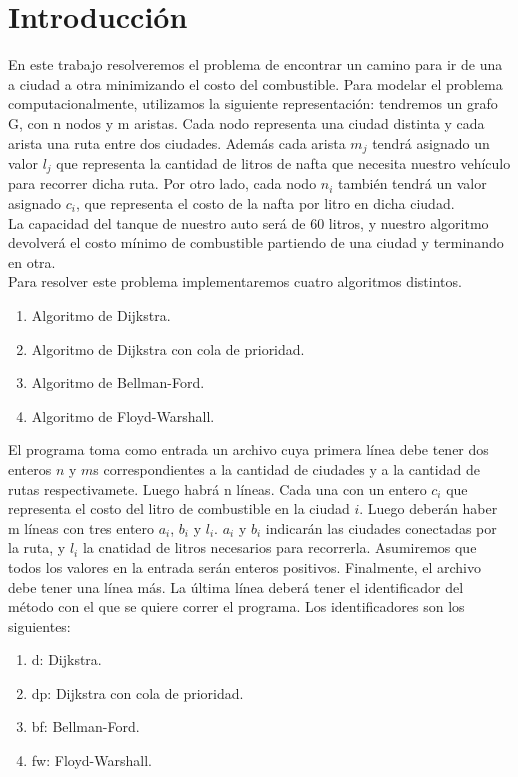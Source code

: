 \section{Introducci\'on}

En este trabajo resolveremos el problema de encontrar un camino para ir de una a ciudad a otra minimizando el costo del combustible. Para modelar el problema computacionalmente, utilizamos la siguiente representación: tendremos un grafo G, con n nodos y m aristas. Cada nodo representa una ciudad distinta y cada arista una ruta entre dos ciudades. Además cada arista $m_{j}$ tendrá asignado un valor $l_{j}$ que representa la cantidad de litros de nafta que necesita nuestro vehículo para recorrer dicha ruta. Por otro lado, cada nodo $n_{i}$  también tendrá un valor asignado $c_{i}$, que representa el costo de la nafta por litro en dicha ciudad. \\
\indent La capacidad del tanque de nuestro auto será de 60 litros, y nuestro algoritmo devolverá el costo mínimo de combustible partiendo de una ciudad y terminando en otra.\\
\indent Para resolver este problema implementaremos cuatro algoritmos distintos.
\begin{enumerate}
\item Algoritmo de Dijkstra.
\item Algoritmo de Dijkstra con cola de prioridad.
\item Algoritmo de Bellman-Ford.
\item Algoritmo de Floyd-Warshall.
\end{enumerate}

\indent El programa toma como entrada un archivo cuya primera línea debe tener dos enteros $n$ y $m$s correspondientes a la cantidad de ciudades y a la cantidad de rutas respectivamete. Luego habrá n líneas. Cada una con un entero $c_{i}$ que representa el costo del litro de combustible en la ciudad $i$. Luego deberán haber m líneas con tres entero $a_{i}$, $b_{i}$ y $l_{i}$. $a_{i}$ y $b_{i}$ indicarán las ciudades conectadas por la ruta, y $l_{i}$ la cnatidad de litros necesarios para recorrerla. Asumiremos que todos los valores en la entrada serán enteros positivos. Finalmente, el archivo debe tener una línea más. La última línea deberá tener el identificador del método con el que se quiere correr el programa. Los identificadores son los siguientes:
\begin{enumerate}
\item d: Dijkstra.
\item dp: Dijkstra con cola de prioridad.
\item bf: Bellman-Ford.
\item fw: Floyd-Warshall.
\end{enumerate}

